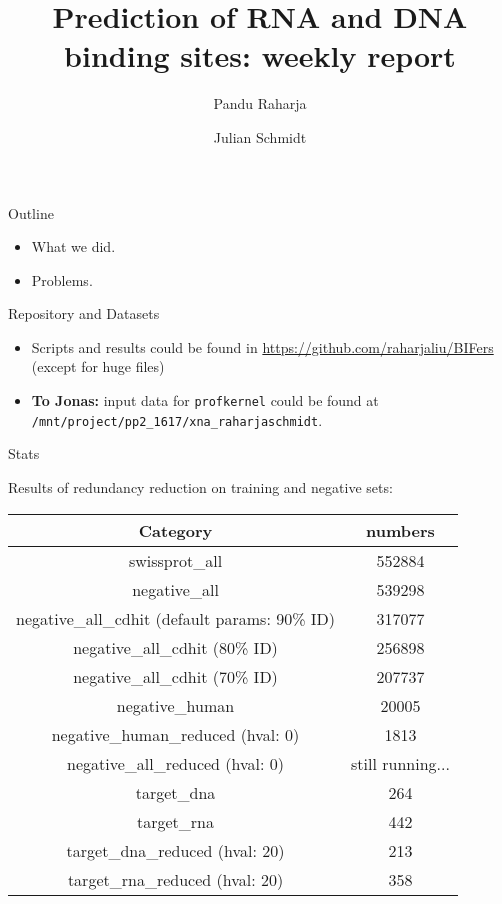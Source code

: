 \documentclass[pdf]
{beamer}
\title{Prediction of RNA and DNA binding sites: weekly report}
\subtitle{}
\author[shortname]{Pandu Raharja \inst{1, 2} \and Julian Schmidt \inst{1, 2}}
\institute[shortinst]{\inst{1} Technische Universit\"at M\"unchen \and %
                      \inst{2} Ludwig-Maximilians-Universit\"at M\"unchen}
\begin{document}
\begin{frame}
\titlepage
\end{frame}

\begin{frame}{Outline}
	\begin{itemize}
		\item What we did.
		\item Problems.  
	\end{itemize}
\end{frame}

\begin{frame}{Repository and Datasets}
	\begin{itemize}
		\item Scripts and results could be found in \href{https://github.com/raharjaliu/BIFers}{https://github.com/raharjaliu/BIFers} (except for huge files)
		\item \textbf{To Jonas:} input data for \texttt{profkernel} could be found at \texttt{/mnt/project/pp2\_1617/xna\_raharjaschmidt}.
	\end{itemize}
\end{frame}

\begin{frame}{Stats}

	Results of redundancy reduction on training and negative sets:\\
	\begin{center}
		\begin{tabular}{| c | c |}
			\hline
			Category & numbers \\
			\hline
			swissprot\_all & 552884 \\
			negative\_all & 539298\\
			negative\_all\_cdhit (default params: 90\% ID) & 317077 \\  
			negative\_all\_cdhit (80\% ID) & 256898  \\
			negative\_all\_cdhit (70\% ID) & 207737 \\ 
			negative\_human & 20005 \\
			negative\_human\_reduced (hval: 0) & 1813 \\ 
			negative\_all\_reduced (hval: 0) & still running... \\ 
			\hline
			target\_dna & 264 \\
			target\_rna & 442 \\
			target\_dna\_reduced (hval: 20) & 213 \\
			target\_rna\_reduced (hval: 20) & 358 \\
			\hline
		\end{tabular}
	\end{center}

\end{frame}
\end{document}
